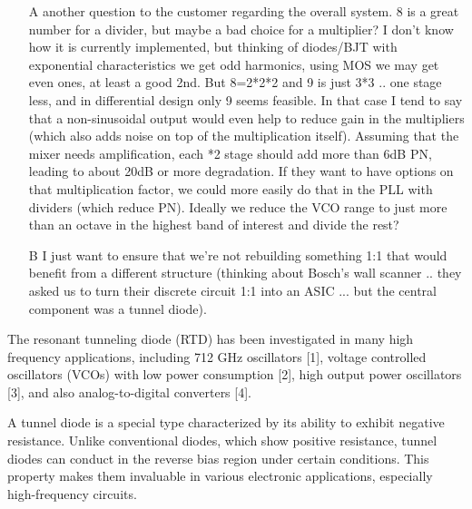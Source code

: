 \documentclass{article}
\begin{document}
\begin{itemize}

	\item [A] another question to the customer regarding the overall system. 8 is a great number for a divider, but maybe a bad choice for a multiplier? I don't know how it is currently implemented, but thinking of diodes/BJT with exponential characteristics we get odd harmonics, using MOS we may get even ones, at least a good 2nd. But 8=2*2*2 and 9 is just 3*3 .. one stage less, and in differential design only 9 seems feasible. In that case I tend to say that a non-sinusoidal output would even help to reduce gain in the multipliers (which also adds noise on top of the multiplication itself). Assuming that the mixer needs amplification, each *2 stage should add more than 6dB PN, leading to about 20dB or more degradation. If they want to have options on that multiplication factor, we could more easily do that in the PLL with dividers (which reduce PN). Ideally we reduce the VCO range to just more than an octave in the highest band of interest and divide the rest?

	\item [B] I just want to ensure that we're not rebuilding something 1:1 that would benefit from a different structure (thinking about Bosch's wall scanner .. they asked us to turn their discrete circuit 1:1 into an ASIC ... but the central component was a tunnel diode).

\end{itemize}

\begin{info}
	The resonant tunneling diode (RTD) has been investigated in many high frequency applications, including 712 GHz oscillators [1], voltage controlled oscillators (VCOs) with low power consumption [2], high output power oscillators [3], and also analog-to-digital converters [4].
\end{info}

A tunnel diode is a special type characterized by its ability to exhibit negative resistance. Unlike conventional diodes, which show positive resistance, tunnel diodes can conduct in the reverse bias region under certain conditions. This property makes them invaluable in various electronic applications, especially high-frequency circuits.
\end{document}
